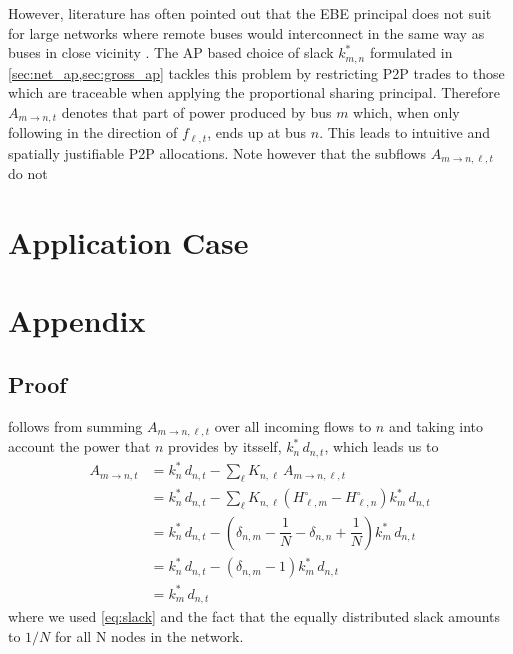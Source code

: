 \documentclass[11pt,twocolumn]{article}
\newcommand{\nodaldemand}[1][n]{d_{#1,t}}
\newcommand{\incidence}[1][n]{K_{#1,\ell}}
\newcommand{\ptdf}[1][n]{H_{\ell,#1}}
\newcommand{\ptdfEqual}[1][n]{\ptdf[#1]^\circ}
\newcommand{\slackk}[1][n]{k^*_{#1}}
\newcommand{\Slackk}{k^*_{m,n}}
\newcommand{\flow}{f_{\ell,t}}
\newcommand{\allocatePeer}[1][m \rightarrow n]{A_{#1,t}}
\newcommand{\allocateTransaction}[1][m \rightarrow n]{A_{#1,\ell,t}}
\begin{document}
However, literature has often pointed out that the EBE principal does not suit for large networks where remote buses would interconnect in the same way as buses in close vicinity \cite{gil_multiarea_2005}. The AP based choice of slack $\Slackk$ formulated in \cref{sec:net_ap,sec:gross_ap} tackles this problem by restricting P2P trades to those which are traceable when applying the proportional sharing principal. Therefore $\allocatePeer$ denotes that part of power produced by bus $m$ which, when only following in the direction of $\flow$, ends up at bus $n$. This leads to intuitive and spatially justifiable P2P allocations. Note however that the subflows $\allocateTransaction$ do not 


\section{Application Case}


\clearpage
\appendix

\section{Appendix}

\subsection{\texorpdfstring{Proof }{First Proof}}
\label{sec:proof_allocate_peer}

 follows from summing $\allocateTransaction$ over all incoming flows to $n$ and taking into account the power that $n$ provides by itsself, $\slackk \, \nodaldemand$, which leads us to
\begin{align*}
\allocatePeer &= \slackk \, \nodaldemand - \sum_{\ell} \incidence \, \allocateTransaction \\
&= \slackk \, \nodaldemand - \sum_\ell \incidence \left(  \ptdfEqual[m] - \ptdfEqual \right) \slackk[m] \, \nodaldemand  \\
&= \slackk \, \nodaldemand - \left(  \delta_{n,m} - \dfrac{1}{N} - \delta_{n,n} + \dfrac{1}{N} \right) \slackk[m] \, \nodaldemand  \\
&= \slackk \, \nodaldemand - \left(  \delta_{n,m} - 1 \right) \slackk[m] \, \nodaldemand  \\
&= \slackk[m] \, \nodaldemand 
\end{align*}
where we used \cref{eq:slack} and the fact that the equally distributed slack amounts to $1/N$ for all N nodes in the network. 
\end{document}
